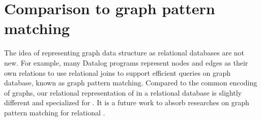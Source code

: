 \section{Comparison to graph pattern matching}

The idea of representing graph data structure as relational databases are not new. For example, many Datalog programs represent nodes and edges as their own relations to use relational joins to support efficient queries on graph database, known as graph pattern matching. Compared to the common encoding of graphs, our relational representation of \egraphs in a relational database is slightly different and specialized for \egraphs. It is a future work to absorb researches on graph pattern matching for relational \ematching.

